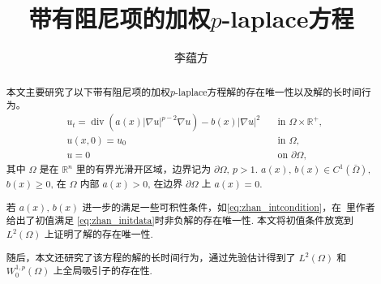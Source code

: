 \documentclass[twoside,longtitle]{LZUthesis}
\theoremstyle{definition}
\numberwithin{equation}{chapter}
\newcommand*\abs[1]{\lvert#1\rvert}
\newcommand\R{\mathbb{R}}
\DeclareMathOperator{\Div}{div}
\begin{document}
\classification{}

\confidential{}

\title{带有阻尼项的加权$p$-laplace方程}




\author{李蕴方}






\submitdate{}


\degreedate{}


\maketitle

\makestatement

\frontmatter{}

\begin{abstract}
本文主要研究了以下带有阻尼项的加权$p$-laplace方程解的存在唯一性以及解的长时间行为。
\begin{equation*}
	\begin{alignedat}{2}
	& u_t = \Div(a(x)\abs{\nabla u}^{p-2}\nabla u) - b(x)\abs{\nabla u}^2 \quad &\text{in } \Omega \times \R^+,\\
	& u(x,0) = u_0 \quad &\text{in } \Omega,\\
	& u = 0 \quad &\text{on } \partial\Omega,
	\end{alignedat}
\end{equation*}
其中 $\Omega$ 是在 $\R^{n}$ 里的有界光滑开区域，边界记为 $\partial\Omega$, $p>1$.
$ a(x)$, $b(x) \in C^1(\bar{\Omega}) $, $b(x) \geq 0$, 在 $\Omega$ 内部 $a(x) > 0$, 在边界 $\partial\Omega$ 上 $a(x) = 0$.

若 $a(x)$, $b(x)$ 进一步的满足一些可积性条件，如\cref{eq:zhan_intcondition}，在~\citep{Zhan2019Uniquenessa}里作者给出了初值满足
\cref{eq:zhan_initdata}时非负解的存在唯一性. 本文将初值条件放宽到 $L^2(\Omega)$ 上证明了解的存在唯一性.

随后，本文还研究了该方程的解的长时间行为，通过先验估计得到了 $L^2(\Omega)$ 和 $W_0^{1,p}(\Omega)$ 上全局吸引子的存在性.
\end{abstract}
\end{document}
